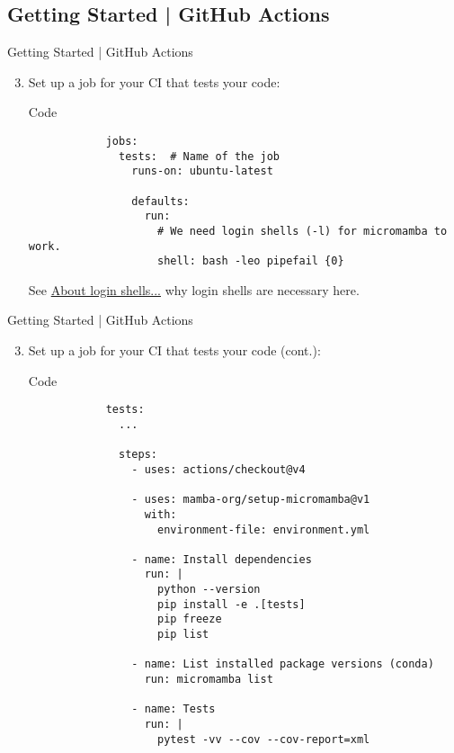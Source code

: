 \subsection{Getting Started | GitHub Actions}
\begin{frame}[fragile]{Getting Started | GitHub Actions}
  \begin{enumerate}
      \setcounter{enumi}{2}
      \item Set up a job for your CI that tests your code:
        \begin{block}{Code}
          \begin{verbatim}
            jobs:
              tests:  # Name of the job
                runs-on: ubuntu-latest

                defaults:
                  run:
                    # We need login shells (-l) for micromamba to work.
                    shell: bash -leo pipefail {0}
          \end{verbatim}
        \end{block}
        \textcolor{vertexLightGrey}{See} \href{https://github.com/mamba-org/setup-micromamba?tab=readme-ov-file#about-login-shells}{About login shells...}
        \textcolor{vertexLightGrey}{why login shells are necessary here.}
    \end{enumerate}
\end{frame}

\begin{frame}[fragile]{
    Getting Started | GitHub Actions
    \hfill
  }
  \begin{enumerate}
    \setcounter{enumi}{2}
    \item Set up a job for your CI that tests your code (cont.):
      \begin{block}{Code}
        \footnotesize
        \begin{verbatim}
            tests:
              ...

              steps:
                - uses: actions/checkout@v4

                - uses: mamba-org/setup-micromamba@v1
                  with:
                    environment-file: environment.yml

                - name: Install dependencies
                  run: |
                    python --version
                    pip install -e .[tests]
                    pip freeze
                    pip list

                - name: List installed package versions (conda)
                  run: micromamba list

                - name: Tests
                  run: |
                    pytest -vv --cov --cov-report=xml
        \end{verbatim}
      \end{block}
  \end{enumerate}
\end{frame}

